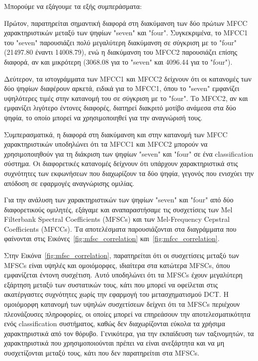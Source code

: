 \documentclass[a4paper,12pt]{article}
\begin{document}
Mπορούμε να εξάγουμε τα εξής συμπεράσματα:

Πρώτον, παρατηρείται σημαντική διαφορά στη διακύμανση των δύο πρώτων MFCC χαρακτηριστικών μεταξύ των ψηφίων "seven" και "four".
Συγκεκριμένα, το MFCC1 του "seven" παρουσιάζει πολύ μεγαλύτερη διακύμανση σε σύγκριση με το "four" (21497.80 έναντι 14008.79),
ενώ η διακύμανση του MFCC2 παρουσιάζει επίσης διαφορά, αν και μικρότερη (3068.08 για το "seven" και 4096.44 για το "four").

Δεύτερον, τα ιστογράμματα των MFCC1 και MFCC2 δείχνουν ότι οι κατανομές των δύο ψηφίων διαφέρουν αρκετά,
ειδικά για το MFCC1, όπου το "seven" εμφανίζει υψηλότερες τιμές στην κατανομή του σε σύγκριση με το "four".
Το MFCC2, αν και εμφανίζει λιγότερο έντονες διαφορές, διατηρεί διακριτό μοτίβο ανάμεσα στα δύο ψηφία,
το οποίο μπορεί να χρησιμοποιηθεί για την αναγνώρισή τους.

Συμπερασματικά, η διαφορά στη διακύμανση και στην κατανομή των MFCC χαρακτηριστικών υποδηλώνει ότι τα MFCC1 και
MFCC2 μπορούν να χρησιμοποιηθούν για τη διάκριση των ψηφίων "seven" και "four" σε ένα classification σύστημα.
Οι διαφορετικές κατανομές δείχνουν ότι υπάρχουν χαρακτηριστικά στις συχνότητες των εκφωνήσεων που
διαχωρίζουν τα δύο ψηφία, γεγονός που ενισχύει την απόδοση σε εφαρμογές αναγνώρισης ομιλίας.

Για την ανάλυση των χαρακτηριστικών των ψηφίων "seven" και "four" από δύο διαφορετικούς ομιλητές,
εξάγαμε και αναπαραστήσαμε τις συσχετίσεις των Mel Filterbank Spectral Coefficients (MFSCs) και των Mel-Frequency Cepstral Coefficients (MFCCs).
Τα αποτελέσματα παρουσιάζονται στα διαγράμματα που φαίνονται στις Εικόνες~\ref{fig:mfsc_correlation} και~\ref{fig:mfcc_correlation}.

Στην Εικόνα~\ref{fig:mfsc_correlation}, παρατηρείται ότι οι συσχετίσεις μεταξύ των MFSCs είναι υψηλές και ομοιόμορφες,
ιδιαίτερα στα κατώτερα MFSCs, όπου εμφανίζεται έντονη συσχέτιση. Αυτό υποδηλώνει ότι τα MFSCs
έχουν μεγαλύτερη εξάρτηση μεταξύ των συστατικών τους, κάτι που μπορεί να οφείλεται στις ακατέργαστες
συχνότητες χωρίς την εφαρμογή του μετασχηματισμού DCT. Η ομοιόμορφη κατανομή των υψηλών συσχετίσεων
δείχνει ότι τα MFSCs περιέχουν πλεονάζουσες πληροφορίες, οι οποίες μπορεί να επηρεάσουν την
αποτελεσματικότητα ενός classification συστήματος, καθώς δεν διαχωρίζονται εύκολα τα χρήσιμα χαρακτηριστικά από τον θόρυβο.
Γενικότερα, για την εκπαίδευση των ταξινομητών, τα χαρακτηριστικά που χρησιμοποιούνται πρέπει να είναι ανεξάρτητα και
να μη συσχετίζονται μεταξύ τους, κάτι που δεν παρατηρείται στα MFSCs.
\end{document}
